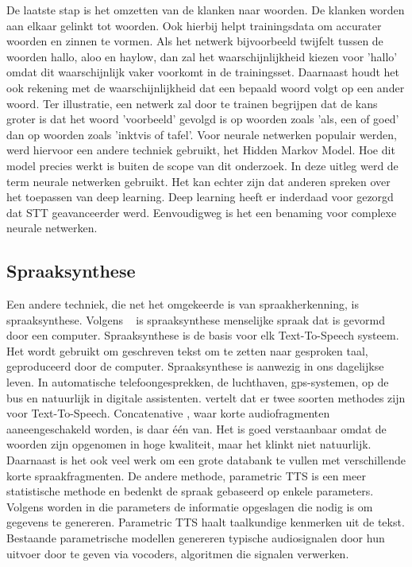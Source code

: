 De laatste stap is het omzetten van de klanken naar woorden. De klanken worden aan elkaar gelinkt tot woorden. Ook hierbij helpt trainingsdata om accurater woorden en zinnen te vormen. Als het netwerk bijvoorbeeld twijfelt tussen de woorden hallo, aloo en haylow, dan zal het waarschijnlijkheid kiezen voor 'hallo' omdat dit waarschijnlijk vaker voorkomt in de trainingsset. Daarnaast houdt het ook rekening met de waarschijnlijkheid dat een bepaald woord volgt op een ander woord. Ter illustratie, een netwerk zal door te trainen begrijpen dat de kans groter is dat het woord 'voorbeeld' gevolgd is op woorden zoals 'als, een of goed' dan op woorden zoals 'inktvis of tafel'. Voor neurale netwerken populair werden, werd hiervoor een andere techniek gebruikt, het Hidden Markov Model. Hoe dit model precies werkt is buiten de scope van dit onderzoek.
In deze uitleg werd de term neurale netwerken gebruikt. Het kan echter zijn dat anderen spreken over het toepassen van deep learning. Deep learning heeft er inderdaad voor gezorgd dat \gls{STT} geavanceerder werd. Eenvoudigweg is het een benaming voor complexe neurale netwerken. 

\subsection{Spraaksynthese}
Een andere techniek, die net het omgekeerde is van spraakherkenning, is spraaksynthese. Volgens ~\textcite{Rouse2016} is spraaksynthese menselijke spraak dat is gevormd door een computer. Spraaksynthese is de basis voor elk Text-To-Speech systeem. Het wordt gebruikt om geschreven tekst om te zetten naar gesproken taal, geproduceerd door de computer.
Spraaksynthese is aanwezig in ons dagelijkse leven. In automatische telefoongesprekken, de luchthaven, gps-systemen, op de bus en natuurlijk in digitale assistenten. \textcite{Seijas2018} vertelt dat er twee soorten methodes zijn voor Text-To-Speech. Concatenative , waar korte audiofragmenten aaneengeschakeld worden, is daar één van. Het is goed verstaanbaar omdat de woorden zijn opgenomen in hoge kwaliteit, maar het klinkt niet natuurlijk. Daarnaast is het ook veel werk om een grote databank te vullen met verschillende korte spraakfragmenten. De andere methode, parametric \gls{TTS} is een meer statistische methode en  bedenkt de spraak gebaseerd op enkele parameters. Volgens \textcite{Oord2016} worden in die parameters de informatie opgeslagen die nodig is om gegevens te genereren. Parametric \gls{TTS} haalt taalkundige kenmerken uit de tekst. Bestaande parametrische modellen genereren typische audiosignalen door hun uitvoer door te geven via vocoders, algoritmen die signalen verwerken.

